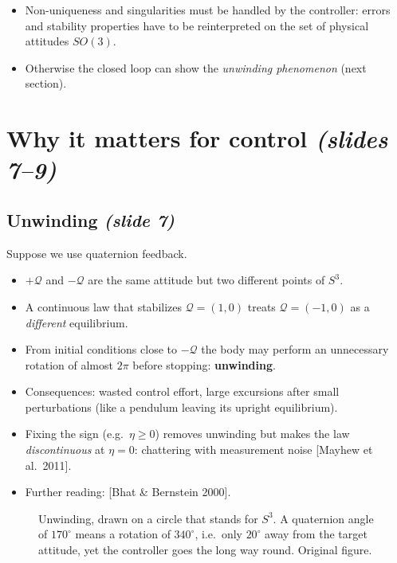 \documentclass[11pt,a4paper]{article}
\newcommand{\sli}[1]{\emph{(#1)}}
\theoremstyle{definition}
\theoremstyle{plain}
\theoremstyle{remark}
\begin{document}
\begin{itemize}
  \item Non-uniqueness and singularities must be handled by the controller: errors and stability properties have to be reinterpreted on the set of physical attitudes $SO(3)$.
  \item Otherwise the closed loop can show the \emph{unwinding phenomenon} (next section).
\end{itemize}

\section{Why it matters for control \sli{slides 7--9}}

\subsection{Unwinding \sli{slide 7}}

Suppose we use quaternion feedback.
\begin{itemize}
  \item $+\mathcal Q$ and $-\mathcal Q$ are the same attitude but two different points of $S^3$.
  \item A continuous law that stabilizes $\mathcal Q=(1,0)$ treats $\mathcal Q=(-1,0)$ as a \emph{different} equilibrium.
  \item From initial conditions close to $-\mathcal Q$ the body may perform an unnecessary rotation of almost $2\pi$ before stopping: \textbf{unwinding}.
  \item Consequences: wasted control effort, large excursions after small perturbations (like a pendulum leaving its upright equilibrium).
  \item Fixing the sign (e.g.\ $\eta\ge0$) removes unwinding but makes the law \emph{discontinuous} at $\eta=0$: chattering with measurement noise [Mayhew et al.\ 2011].
  \item Further reading: [Bhat \& Bernstein 2000].
\end{itemize}

\begin{figure}[h]
\centering
{}
\caption{Unwinding, drawn on a circle that stands for $S^3$. A quaternion angle of $170^\circ$ means a rotation of $340^\circ$, i.e.\ only $20^\circ$ away from the target attitude, yet the controller goes the long way round. Original figure.}
\end{figure}
\end{document}

